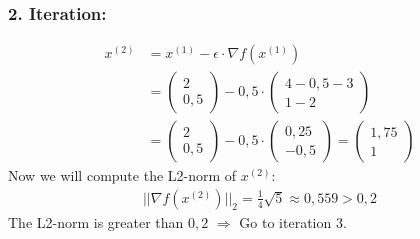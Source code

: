 \documentclass[a4paper]{article}
\begin{document}
        \subsubsection*{2. Iteration:}
            \begin{align*}
                x^{(2)} &= x^{(1)} - \epsilon \cdot \nabla f(x^{(1)})\\
                &= \left( \begin{matrix} 2 \\ 0,5 \end{matrix} \right) - 0,5 \cdot \left( \begin{matrix} 4-0,5-3 \\ 1-2 \end{matrix} \right)\\
                &= \left( \begin{matrix} 2 \\ 0,5 \end{matrix} \right) - 0,5 \cdot \left( \begin{matrix} 0,25 \\ -0,5 \end{matrix} \right)
                = \left( \begin{matrix} 1,75 \\ 1 \end{matrix} \right)
            \end{align*}
            Now we will compute the L2-norm of $x^{(2)}$:
            \begin{align*}
                ||\nabla f(x^{(2)})||_2 = \frac{1}{4} \sqrt{5} \approx 0,559 > 0,2
            \end{align*}
            The L2-norm is greater than $0,2$ $\Rightarrow$ Go to iteration 3.
\end{document}
